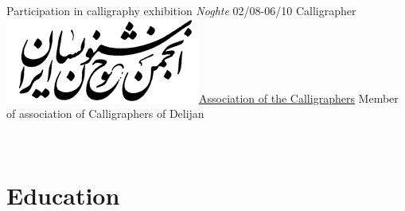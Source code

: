 \documentclass[a4paper]{friggeri-cv}
\begin{document}
\begin{entrylist}
        {Participation in calligraphy exhibition \emph{Noghte}}
        \entry
        {02/08-06/10}
        {   Calligrapher}
        {\href{http://calligraphers.ir/}{\includegraphics[scale=0.15]{../assets/images/logos/Khoshnevisan_logo.png}Association of the Calligraphers}}
        {Member of association of Calligraphers of Delijan}
    \end{entrylist}
    \\
    \section{Education}\label{sec:education}
\end{document}

